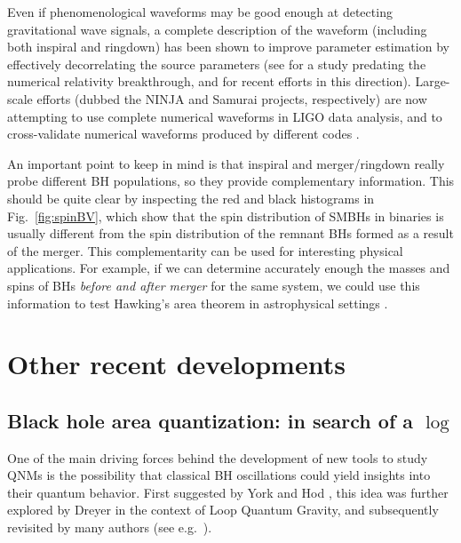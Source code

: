 \documentclass[]{iopart}
\begin{document}
Even if phenomenological waveforms may be good enough at detecting
gravitational wave signals, a complete description of the waveform (including
both inspiral and ringdown) has been shown to improve parameter estimation by
effectively decorrelating the source parameters (see \cite{Luna:2006gw} for a
study predating the numerical relativity breakthrough, and
\cite{Babak:2008bu,Thorpe:2008wh,Ajith:2007qp,Ajith:2007kx,Ajith:2009fz} for
recent efforts in this direction). Large-scale efforts (dubbed the NINJA and
Samurai projects, respectively) are now attempting to use complete numerical
waveforms in LIGO data analysis, and to cross-validate numerical waveforms
produced by different codes \cite{Aylott:2009ya,Hannam:2009hh}.

An important point to keep in mind is that inspiral and merger/ringdown really
probe different BH populations, so they provide complementary
information. This should be quite clear by inspecting the red and black
histograms in Fig.~\ref{fig:spinBV}, which show that the spin distribution of
SMBHs in binaries is usually different from the spin distribution of the
remnant BHs formed as a result of the merger. This complementarity can be used
for interesting physical applications. For example, if we can determine
accurately enough the masses and spins of BHs {\em before and after merger}
for the same system, we could use this information to test Hawking's area
theorem in astrophysical settings \cite{Hughes:2004vw}.

\section{\label{sec:otherdev}Other recent developments}

\subsection{Black hole area quantization: in search of a $\log$}
One of the main driving forces behind the development of new tools to study
QNMs is the possibility that classical BH oscillations could yield insights
into their quantum behavior. First suggested by York \cite{York:1983zb} and
Hod \cite{Hod:1998vk}, this idea was further explored by Dreyer
\cite{Dreyer:2002vy} in the context of Loop Quantum Gravity, and subsequently
revisited by many authors (see
e.g.~\cite{Corichi:2002ty,Kunstatter:2002pj,Oppenheim:2003sq,Ling:2003iz,
  Setare:2003bd,Kiefer:2004ma,Setare:2004uu,Maggiore:2007nq,Vagenas:2008yi,
  Medved:2008iq,Wei:2009yj}).
\end{document}
